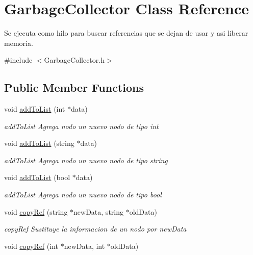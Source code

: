 \hypertarget{class_garbage_collector}{}\section{Garbage\+Collector Class Reference}
\label{class_garbage_collector}


Se ejecuta como hilo para buscar referencias que se dejan de usar y asi liberar memoria.  




{\ttfamily \#include $<$Garbage\+Collector.\+h$>$}

\subsection*{Public Member Functions}
\begin{DoxyCompactItemize}
\item 
void \hyperlink{class_garbage_collector_a17875db60f5b050647bac7c3d3beec21}{add\+To\+List} (int $\ast$data)
\begin{DoxyCompactList}\small\item\em add\+To\+List Agrega nodo un nuevo nodo de tipo int \end{DoxyCompactList}\item 
void \hyperlink{class_garbage_collector_a49ac1532606dd88eb0f7505bc33cd967}{add\+To\+List} (string $\ast$data)
\begin{DoxyCompactList}\small\item\em add\+To\+List Agrega nodo un nuevo nodo de tipo string \end{DoxyCompactList}\item 
void \hyperlink{class_garbage_collector_a5bacb8303b1daea1a260b8c2c0102615}{add\+To\+List} (bool $\ast$data)
\begin{DoxyCompactList}\small\item\em add\+To\+List Agrega nodo un nuevo nodo de tipo bool \end{DoxyCompactList}\item 
void \hyperlink{class_garbage_collector_ab54fe91f0393b678444ed6ef353635b5}{copy\+Ref} (string $\ast$new\+Data, string $\ast$old\+Data)
\begin{DoxyCompactList}\small\item\em copy\+Ref Sustituye la informacion de un nodo por new\+Data \end{DoxyCompactList}\item 
void \hyperlink{class_garbage_collector_a99d3d8fc5d5b7bd13bbe58f4d1b07334}{copy\+Ref} (int $\ast$new\+Data, int $\ast$old\+Data)

\end{DoxyCompactItemize}
